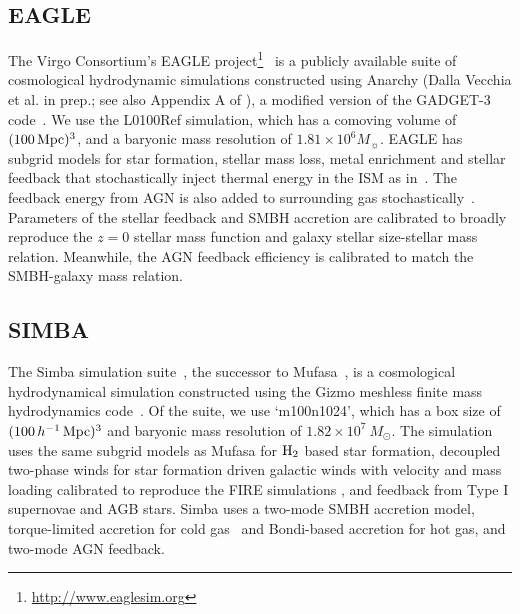 \subsection{EAGLE} \label{sec:eagle} 
The Virgo Consortium's EAGLE
project\footnote{\url{http://www.eaglesim.org}}~\citep{schaye2015, crain2015,
mcalpine2016} is a publicly available suite of cosmological hydrodynamic
simulations constructed using {\sc Anarchy} (Dalla Vecchia et al. in prep.; 
see also Appendix A of \citealt{schaye2015}), a modified version of the 
{\sc GADGET-3} code~\citep{springel2005}. We use the L0100Ref simulation,
which has a comoving volume of $(100\,{\rm Mpc})^3$, and a baryonic mass resolution of $1.81\times 10^6M_{\sun}$. %
EAGLE has subgrid models for star formation, stellar mass loss, metal enrichment
and stellar feedback that stochastically inject thermal energy in the ISM as
in~\citet{dallavecchia2012}. The feedback energy from AGN is also added to
surrounding gas stochastically~\citep{booth2009}. Parameters of the stellar 
feedback and SMBH accretion are calibrated to broadly reproduce the $z=0$ 
stellar mass function and galaxy stellar size-stellar mass relation. Meanwhile, 
the AGN feedback efficiency is calibrated to match the SMBH-galaxy mass relation. 

\subsection{SIMBA} \label{sec:simba}
The {\sc Simba} simulation suite~\citep{dave2019}, the successor to {\sc
Mufasa}~\citep{dave2016, dave2017, dave2017a}, is a cosmological hydrodynamical
simulation constructed using the {\sc Gizmo} meshless finite mass hydrodynamics 
code~\citep{hopkins2015, hopkins2017}. Of the suite, we use
`m100n1024', which has a box size of $(100\,h^{-1}\,{\rm Mpc})^3$ and baryonic 
mass resolution of $1.82 \times 10^7\ M_\odot$. The simulation uses the same
subgrid models as {\sc Mufasa} for $\rm H_2$ based star formation, decoupled
two-phase winds for star formation driven galactic winds with velocity and mass loading 
calibrated to reproduce the FIRE simulations \citep{muratov2015, angles-alcazar2017b}, and feedback from 
Type I supernovae and AGB stars. {\sc Simba} uses a two-mode SMBH accretion 
model, torque-limited accretion for cold gas~\citep{angles-alcazar2017} and 
Bondi-based accretion for hot gas, and two-mode AGN feedback. %


